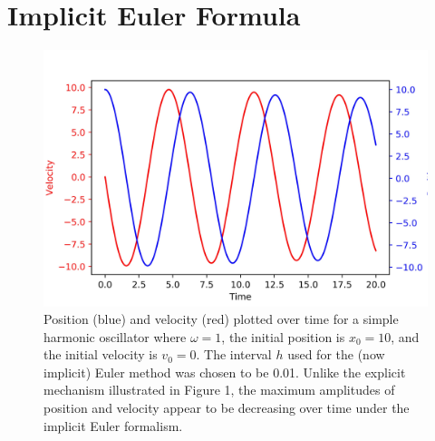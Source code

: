\documentclass{article}
\begin{document}
\section{Implicit Euler Formula}

\begin{figure}[H]
\includegraphics[width=\textwidth]{TVP2.jpg}
\caption{Position (blue) and velocity (red) plotted over time for a simple harmonic oscillator where $\omega=1$, the initial position is $x_0 = 10$, and the initial velocity is $v_0 = 0$. The interval $h$ used for the (now implicit) Euler method was chosen to be 0.01. Unlike the explicit mechanism illustrated in Figure 1, the maximum amplitudes of position and velocity appear to be decreasing over time under the implicit Euler formalism.}
\end{figure}
\end{document}
